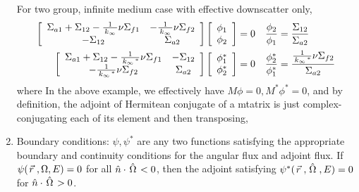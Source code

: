 \documentclass{school-22.211-notes}
\begin{document}
\begin{enumerate}
  For two group, infinite medium case with effective downscatter only, 
    \begin{align}
      \left[ \begin{array}{cc}
          \Sigma_{a1} + \Sigma_{12} - \frac{1}{\left. k_{\infty} \right.} \nu \Sigma_{f1} & - \frac{1}{\left. k_{\infty} \right.} \nu \Sigma_{f2} \\
          - \Sigma_{12} & \Sigma_{a2} \end{array} \right] 
      \left[ \begin{array}{c}
          \phi_1 \\ \phi_2 \end{array} \right] &= 0  
      &\frac{\phi_2}{\phi_1} &= \frac{\Sigma_{12}}{\Sigma_{a2}}   \\
      \left[ \begin{array}{cc}
          \Sigma_{a1} + \Sigma_{12} - \frac{1}{\left. k_{\infty} \right.^*} \nu \Sigma_{f1} & - \Sigma_{12} \\
          - \frac{1}{\left. k_{\infty} \right.^*} \nu \Sigma_{f2} & \Sigma_{a2} \end{array} \right] 
      \left[ \begin{array}{c}
          \phi_1^* \\ \phi_2^* \end{array} \right] &= 0  
      &\frac{\phi_2^*}{\phi_1^*} &= \frac{\frac{1}{\left. k_{\infty} \right.^*} \nu \Sigma_{f2}}{\Sigma_{a2}}  
    \end{align}
    where 
    In the above example, we effectively have $M \phi = 0, M^* \phi^* = 0$, and by definition, the adjoint of Hermitean conjugate of a mtatrix is just complex-conjugating each of its element and then transposing, 
 
  \item Boundary conditions: $\psi, \psi^*$ are any two functions satisfying the appropriate boundary and continuity conditions for the angular flux and adjoint flux. If $\psi(\left.\vec{r}\right., \Omega, E) = 0$ for all $\hat{n} \cdot \left. \hat{\Omega} \right. < 0$, then the adjoint satisfying $\psi^*(\left.\vec{r}\right., \left. \hat{\Omega} \right., E) = 0$ for $\hat{n} \cdot \left. \hat{\Omega} \right. > 0$. 



\end{enumerate}
\end{document}

